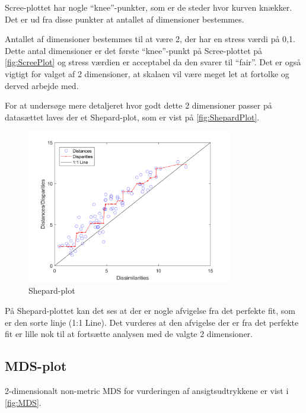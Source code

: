 \noindent Scree-plottet har nogle ``knee''-punkter, som er de steder hvor kurven knækker. Det er ud fra disse punkter at antallet af dimensioner bestemmes. 

\noindent Antallet af dimensioner bestemmes til at være 2, der har en stress værdi på 0,1. Dette antal dimensioner er det første ``knee''-punkt på Scree-plottet på \autoref{fig:ScreePlot} og stress værdien er acceptabel da den svarer til ``fair''. Det er også vigtigt for valget af 2 dimensioner, at skalaen vil være meget let at fortolke og derved arbejde med. 

For at undersøge mere detaljeret hvor godt dette 2 dimensioner passer på datasættet laves der et Shepard-plot, som er vist på \autoref{fig:ShepardPlot}.

\begin{figure}[H]
\centering
\includegraphics[width = 0.8\textwidth]{Figure/Sheppard_plot.png} 
\caption{Shepard-plot}
\label{fig:ShepardPlot}
\end{figure}

\noindent På Shepard-plottet kan det ses at der er nogle afvigelse fra det perfekte fit, som er den sorte linje (1:1 Line). Det vurderes at den afvigelse der er fra det perfekte fit er lille nok til at fortsætte analysen med de valgte 2 dimensioner. 

\subsection*{MDS-plot}
2-dimensionalt non-metric MDS for vurderingen af ansigtsudtrykkene er vist i \autoref{fig:MDS}.  

